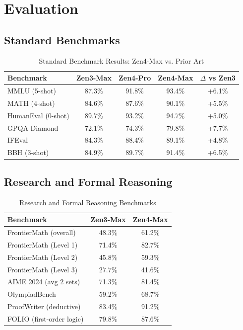 \documentclass[11pt,a4paper]{article}
\begin{document}
\section{Evaluation}

\subsection{Standard Benchmarks}

\begin{table}[H]
\centering
\begin{tabular}{lcccc}
\toprule
\textbf{Benchmark} & \textbf{Zen3-Max} & \textbf{Zen4-Pro} & \textbf{Zen4-Max} & \textbf{$\Delta$ vs Zen3} \\
\midrule
MMLU (5-shot)         & 87.3\% & 91.8\% & 93.4\% & +6.1\% \\
MATH (4-shot)         & 84.6\% & 87.6\% & 90.1\% & +5.5\% \\
HumanEval (0-shot)    & 89.7\% & 93.2\% & 94.7\% & +5.0\% \\
GPQA Diamond          & 72.1\% & 74.3\% & 79.8\% & +7.7\% \\
IFEval                & 84.3\% & 88.4\% & 89.1\% & +4.8\% \\
BBH (3-shot)          & 84.9\% & 89.7\% & 91.4\% & +6.5\% \\
\bottomrule
\end{tabular}
\caption{Standard Benchmark Results: Zen4-Max vs. Prior Art}
\end{table}

\subsection{Research and Formal Reasoning}

\begin{table}[H]
\centering
\begin{tabular}{lcc}
\toprule
\textbf{Benchmark} & \textbf{Zen3-Max} & \textbf{Zen4-Max} \\
\midrule
FrontierMath (overall)        & 48.3\% & 61.2\% \\
FrontierMath (Level 1)        & 71.4\% & 82.7\% \\
FrontierMath (Level 2)        & 45.8\% & 59.3\% \\
FrontierMath (Level 3)        & 27.7\% & 41.6\% \\
AIME 2024 (avg 2 sets)        & 71.3\% & 81.4\% \\
OlympiadBench                 & 59.2\% & 68.7\% \\
ProofWriter (deductive)       & 83.4\% & 91.2\% \\
FOLIO (first-order logic)     & 79.8\% & 87.6\% \\
\bottomrule
\end{tabular}
\caption{Research and Formal Reasoning Benchmarks}
\end{table}
\end{document}
